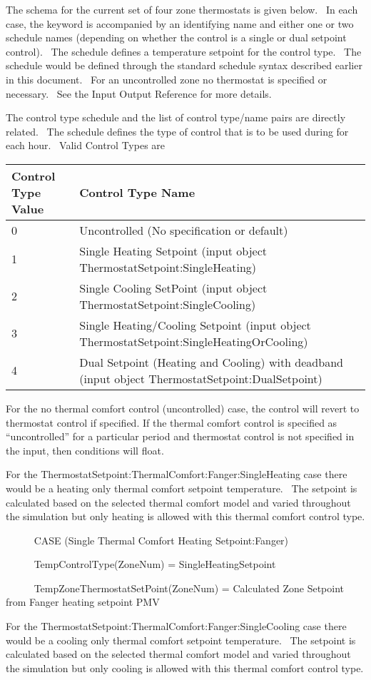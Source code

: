 The schema for the current set of four zone thermostats is given below.~ In each case, the keyword is accompanied by an identifying name and either one or two schedule names (depending on whether the control is a single or dual setpoint control).~ The schedule defines a temperature setpoint for the control type.~ The schedule would be defined through the standard schedule syntax described earlier in this document.~ For an uncontrolled zone no thermostat is specified or necessary.~ See the Input Output Reference for more details.

The control type schedule and the list of control type/name pairs are directly related.~ The schedule defines the type of control that is to be used during for each hour.~ Valid Control Types are

\begin{longtable}[c]{p{1.5in}p{4.5in}}
\toprule 
Control Type Value & Control Type Name \tabularnewline \midrule
\endhead
0 & Uncontrolled (No specification or default) \tabularnewline
1 & Single Heating Setpoint (input object ThermostatSetpoint:SingleHeating) \tabularnewline
2 & Single Cooling SetPoint (input object ThermostatSetpoint:SingleCooling) \tabularnewline
3 & Single Heating/Cooling Setpoint (input object ThermostatSetpoint:SingleHeatingOrCooling) \tabularnewline
4 & Dual Setpoint (Heating and Cooling) with deadband (input object ThermostatSetpoint:DualSetpoint) \tabularnewline
\bottomrule
\end{longtable}

For the no thermal comfort control (uncontrolled) case, the control will revert to thermostat control if specified. If the thermal comfort control is specified as ``uncontrolled'' for a particular period and thermostat control is not specified in the input, then conditions will float.

For the ThermostatSetpoint:ThermalComfort:Fanger:SingleHeating case there would be a heating only thermal comfort setpoint temperature.~ The setpoint is calculated based on the selected thermal comfort model and varied throughout the simulation but only heating is allowed with this thermal comfort control type.

~~~~~ CASE (Single Thermal Comfort Heating Setpoint:Fanger)

~~~~~ TempControlType(ZoneNum) = SingleHeatingSetpoint

~~~~~ TempZoneThermostatSetPoint(ZoneNum) = Calculated Zone Setpoint from Fanger heating setpoint PMV

For the ThermostatSetpoint:ThermalComfort:Fanger:SingleCooling case there would be a cooling only thermal comfort setpoint temperature.~ The setpoint is calculated based on the selected thermal comfort model and varied throughout the simulation but only cooling is allowed with this thermal comfort control type.

